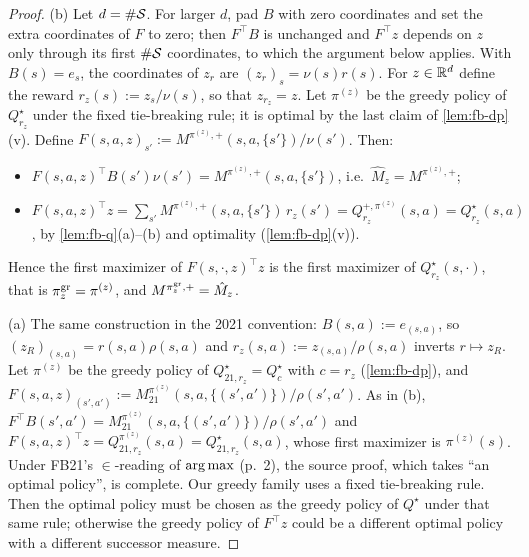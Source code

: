 \begin{proof}
(b) Let $d=\#\mathcal{S}$. For larger $d$, pad $B$ with zero coordinates and set the extra coordinates of $F$ to zero; then $F^\top B$ is unchanged and $F^\top z$ depends on $z$ only through its first $\#\mathcal{S}$ coordinates, to which the argument below applies.
With $B(s)=e_s$, the coordinates of $z_r$ are $(z_r)_s=\nu(s)r(s)$.
For $z\in\mathbb{R}^d$ define the reward $r_z(s):=z_s/\nu(s)$, so that $z_{r_z}=z$.
Let $\pi^{(z)}$ be the greedy policy of $Q^\star_{r_z}$ under the fixed tie-breaking rule; it is optimal by the last claim of \cref{lem:fb-dp}(v).
Define $F(s,a,z)_{s'}:=M^{\pi^{(z)},+}(s,a,\{s'\})/\nu(s')$. Then:
\begin{itemize}[nosep]
\item $F(s,a,z)^\top B(s')\nu(s')=M^{\pi^{(z)},+}(s,a,\{s'\})$, i.e.\ $\hat M_z=M^{\pi^{(z)},+}$;
\item $F(s,a,z)^\top z=\sum_{s'}M^{\pi^{(z)},+}(s,a,\{s'\})\,r_z(s')=Q^{+,\pi^{(z)}}_{r_z}(s,a)=Q^\star_{r_z}(s,a)$, by \cref{lem:fb-q}(a)--(b) and optimality (\cref{lem:fb-dp}(v)).
\end{itemize}
Hence the first maximizer of $F(s,\cdot,z)^\top z$ is the first maximizer of $Q^\star_{r_z}(s,\cdot)$, that is $\pi^{\mathrm{gr}}_z=\pi^{(z)}$, and $M^{\pi^{\mathrm{gr}}_z,+}=\hat M_z$.

(a) The same construction in the 2021 convention: $B(s,a):=e_{(s,a)}$, so $(z_R)_{(s,a)}=r(s,a)\rho(s,a)$ and $r_z(s,a):=z_{(s,a)}/\rho(s,a)$ inverts $r\mapsto z_R$.
Let $\pi^{(z)}$ be the greedy policy of $Q^\star_{21,r_z}=Q^\star_c$ with $c=r_z$ (\cref{lem:fb-dp}), and $F(s,a,z)_{(s',a')}:=M^{\pi^{(z)}}_{21}(s,a,\{(s',a')\})/\rho(s',a')$.
As in (b), $F^\top B(s',a')=M^{\pi^{(z)}}_{21}(s,a,\{(s',a')\})/\rho(s',a')$ and $F(s,a,z)^\top z=Q^{\pi^{(z)}}_{21,r_z}(s,a)=Q^\star_{21,r_z}(s,a)$, whose first maximizer is $\pi^{(z)}(s)$.
Under FB21's $\in$-reading of $\operatorname*{arg\,max}$ (p.~2), the source proof, which takes ``an optimal policy'', is complete.
Our greedy family uses a fixed tie-breaking rule. Then the optimal policy must be chosen as the greedy policy of $Q^\star$ under that same rule; otherwise the greedy policy of $F^\top z$ could be a different optimal policy with a different successor measure.


\end{proof}
